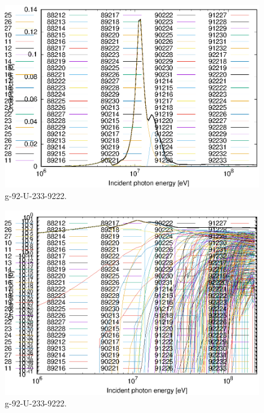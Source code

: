 \begin{figure}
 \includegraphics[width=\linewidth]{eps/g_92-U-233_9222.eps}
  \caption{g-92-U-233-9222.}
\end{figure}
\begin{figure}
 \includegraphics[width=\linewidth]{eps-log/g_92-U-233_9222.eps}
 \caption{g-92-U-233-9222.}
\end{figure}
\newpage \clearpage

